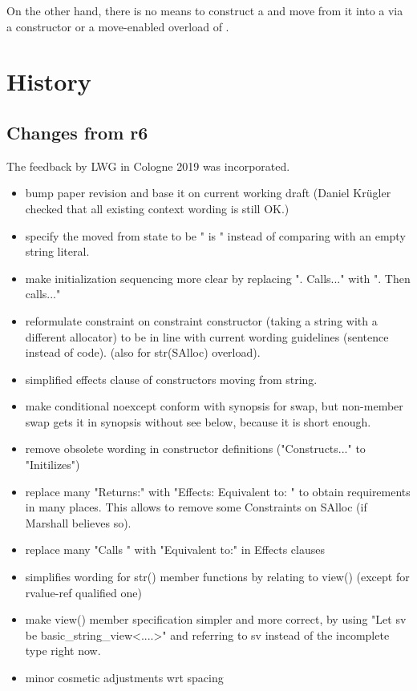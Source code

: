 \documentclass[ebook,11pt,article]{memoir}
\begin{document}
On the other hand, there is no means to construct a  and move from it into a  via a constructor or a move-enabled overload of .

\section{History}
\subsection{Changes from r6}
The feedback by LWG in Cologne 2019 was incorporated.
\begin{itemize}
\item bump paper revision and base it on current working draft  (Daniel Krügler checked that all existing context wording is still OK.)
\item specify the moved from state to be " is " instead of comparing with an empty string literal.
\item make initialization sequencing more clear by replacing ". Calls..." with ". Then calls..."
\item reformulate constraint on constraint constructor (taking a string with a different allocator) to be in line with current wording guidelines (sentence instead of code). (also for str(SAlloc) overload).
\item simplified effects clause of constructors moving from string.
\item make conditional noexcept conform with synopsis for swap, but non-member swap gets it in synopsis without see below, because it is short enough.
\item remove obsolete wording in constructor definitions ("Constructs..." to "Initilizes")
\item replace many "Returns:" with "Effects: Equivalent to: " to obtain requirements in many places. This allows to remove some Constraints on SAlloc (if Marshall believes so).
\item replace many "Calls " with "Equivalent to:" in Effects clauses
\item simplifies wording for str() member functions by relating to view() (except for rvalue-ref qualified one)
\item make view() member specification simpler and more correct, by using "Let sv be basic_string_view<....>" and referring to sv instead of the incomplete type right now.
\item minor cosmetic adjustments wrt spacing
\end{itemize}
\end{document}
